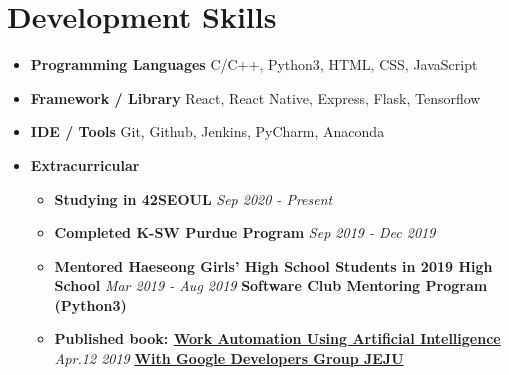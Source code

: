 \documentclass[letterpaper,11pt]{article}
\newcommand{\resumeItem}[2]{
  \item\small{
    \textbf{#1}{ #2 \vspace{-2pt}}
  }
}
\newcommand{\resumeSubHeadingListStart}{\begin{itemize}[leftmargin=*]}
\newcommand{\resumeSubHeadingListEnd}{\end{itemize}}
\newcommand{\resumeItemSubListStart}{\begin{itemize}}
\newcommand{\resumeItemSubListStart}{\begin{itemize}}
\newcommand{\resumeItemSubListEnd}{\end{itemize}\vspace{-5pt}}
\begin{document}
  
\section{Development Skills}
 \resumeSubHeadingListStart
  \resumeItem{Programming Languages}{C/C++, Python3, HTML, CSS, JavaScript}
  \resumeItem{Framework / Library}{React, React Native, Express, Flask, Tensorflow}
  \resumeItem{IDE / Tools}{Git, Github, Jenkins, PyCharm, Anaconda}
  \resumeItem{Extracurricular}{}
    \resumeItemSubListStart
      \resumeItem {Studying in 42SEOUL   }{   }{   }{   }{   }{   }{   }{   }{   }{   }{   }{   }{   }{   }{   }{   }{   }{   }{   }{   }{   }{   }{   }{   }{   }{   }{   }{   }{   }{   }{   }{   }{   }{   }{   }{   }{   }{   }{   }{   }{   }{   }{   }{   }{   }{   }{   }{   }{   }{   }{   }{   }{   }{   }{   }{   }{   }{   }{   }{   }{   }{   }{   }{   }{   }{   }{   }{   }{   }{   }{   }{   }{   }{   }{   }{   }{   }{   }{   }{   }{   }{   }{   }{   }{   }{   }{   }{   }{   }{  }{  }{  }{  }{  }{\emph{Sep 2020 - Present}}
      \resumeItem {Completed K-SW Purdue Program }{    }{   }{   }{   }{   }{   }{   }{   }{   }{   }{   }{   }{   }{   }{   }{   }{   }{   }{   }{   }{   }{   }{   }{   }{   }{   }{   }{   }{   }{   }{   }{   }{   }{   }{   }{   }{   }{   }{   }{   }{   }{   }{   }{   }{   }{   }{   }{   }{   }{   }{   }{   }{   }{   }{   }{   }{   }{   }{   }{   }{   }{   }{   }{   }{   }{   }{   }{   }{   }{   }{   }{  }{  }{  }{  }{  }{\emph{Sep 2019 - Dec 2019}}
      \resumeItem {Mentored Haeseong Girls' High School Students in 2019 High School }{   }{   }{   }{   }{   }{   }{   }{   }{   }{   }{  }{  }{  }{  }{  }{\emph{Mar 2019 - Aug 2019}}
      \textbf{Software Club Mentoring Program (Python3)}
      \resumeItem {Published book: \href{https://ridibooks.com/books/2773000022}{Work Automation Using Artificial Intelligence}}{  }{  }{  }{  }{  }{  }{  }{  }{  }{  }{  }{  }{  }{  }{  }{  }{  }{  }{  }{  }{  }{  }{  }{  }{  }{  }{  }{  }{  }{  }{  }{  }{  }{  }{  }{  }{  }{  }{\emph{Apr.12 2019}}
      \textbf{\href{https://ridibooks.com/books/2773000022}{With Google Developers Group JEJU}}
    \resumeItemSubListEnd
 \resumeSubHeadingListEnd


\end{document}
